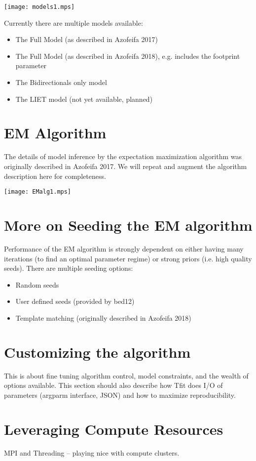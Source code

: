 \documentclass[11pt]{article}
\begin{document}
\texttt{[image: models1.mps]}

Currently there are multiple models available:

\begin{itemize}
\item The Full Model (as described in Azofeifa 2017)
\item The Full Model (as described in Azofeifa 2018), e.g. includes
the footprint parameter
\item The Bidirectionals only model
\item The LIET model (not yet available, planned)
\end{itemize}

\section{EM Algorithm}
The details of model inference by the expectation maximization algorithm was
originally described in Azofeifa 2017.  We will repeat and augment the 
algorithm description here for completeness.

\texttt{[image: EMalg1.mps]}

\section{More on Seeding the EM algorithm}
Performance of the EM algorithm is strongly dependent on either having 
many iterations (to find an optimal parameter regime) or strong priors
(i.e. high quality seeds).  There are multiple seeding options:

\begin{itemize}
\item Random seeds
\item User defined seeds (provided by bed12)
\item Template matching (originally described in Azofeifa 2018)
\end{itemize}

\section{Customizing the algorithm}
This is about fine tuning algorithm control, model constraints, and 
the wealth of options available.   This section should also describe 
how Tfit does I/O of parameters (argparm interface, JSON) and how
to maximize reproducibility. 

\section{Leveraging Compute Resources}
MPI and Threading -- playing nice with compute clusters.

\small{
  
  {}
}
\end{document}
